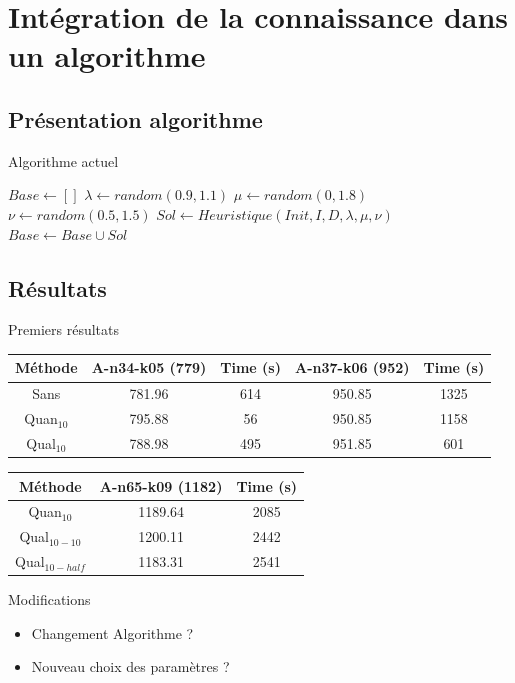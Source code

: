 \documentclass{beamer}
\begin{document}
\section{Intégration de la connaissance dans un algorithme}

\subsection{Présentation algorithme}
\begin{frame}{Algorithme actuel}

\begin{algorithm}[H]
\DontPrintSemicolon %

$Base \gets []$\;
 {
	$\lambda \gets random(0.9,1.1)$\;
	$\mu \gets random(0,1.8)$\;
	$\nu \gets random(0.5,1.5)$\;
	 {
		$Sol \gets Heuristique(Init,I,D,\lambda,\mu,\nu)$\;
		$Base \gets Base \cup Sol$\;
	}
}
\;

\end{algorithm}

\end{frame}

\subsection{Résultats}

\begin{frame}{Premiers résultats}

\begin{tabular}{|c|c|c|c|c|}
   \hline
   Méthode  & A-n34-k05 (779) & Time (s) & A-n37-k06 (952) & Time (s) \\
   \hline
   Sans & 781.96  & 614 & 950.85 & 1325  \\
   \hline
   Quan$_{10}$ & 795.88 & 56 & 950.85 & 1158   \\
   \hline
   Qual$_{10}$ & 788.98 & 495 & 951.85 & 601  \\
   \hline
\end{tabular}

\begin{tabular}{|c|c|c|}
   \hline
   Méthode  & A-n65-k09 (1182) & Time (s) \\
   \hline
   Quan$_{10}$ & 1189.64 & 2085    \\
   \hline
   Qual$_{10-10}$ & 1200.11 & 2442   \\
   \hline
   Qual$_{10-half}$ & 1183.31 & 2541  \\
   \hline
\end{tabular}

\begin{block}{Modifications}
\begin{itemize}
\item Changement Algorithme ?
\item Nouveau choix des paramètres ?
\end{itemize}
\end{block}

\end{frame}
\end{document}
